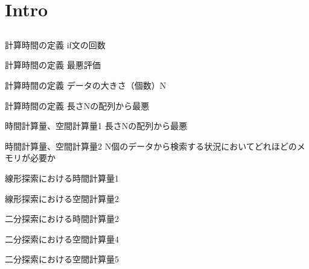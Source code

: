 \documentclass{beamer}
\subtitle{}
\begin{document}
\begin{frame}[fragile]{}
\titlepage
\end{frame}

\section{Intro}		%
\subsection{}

\begin{frame}[fragile]{計算時間の定義}{}
if文の回数
\end{frame}

\begin{frame}[fragile]{計算時間の定義}{}
最悪評価
\end{frame}

\begin{frame}[fragile]{計算時間の定義}{}
データの大きさ（個数）N
\end{frame}

\begin{frame}[fragile]{計算時間の定義}{}
長さNの配列から最悪
\end{frame}

\begin{frame}[fragile]{時間計算量、空間計算量1}{}
長さNの配列から最悪
\end{frame}

\begin{frame}[fragile]{時間計算量、空間計算量2}{}
N個のデータから検索する状況においてどれほどのメモリが必要か
\end{frame}

\begin{frame}[fragile]{線形探索における時間計算量1}{}
\end{frame}

\begin{frame}[fragile]{線形探索における空間計算量2}{}
\end{frame}


\begin{frame}[fragile]{二分探索における時間計算量2}{}
\end{frame}

\begin{frame}[fragile]{二分探索における空間計算量4}{}
\end{frame}

\begin{frame}[fragile]{二分探索における空間計算量5}{}
\end{frame}
\end{document}
